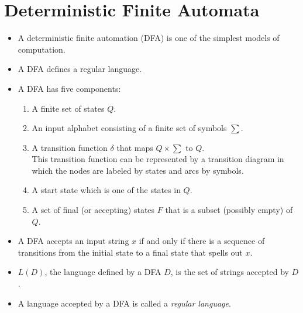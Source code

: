 \documentclass[]{article}
\begin{document}
\section{Deterministic Finite Automata}
  \begin{itemize}
    \item A deterministic finite automation (DFA) is one of the simplest models 
    of computation.
    \item A DFA defines a regular language.
    \item A DFA has five components:
      \begin{enumerate}
        \item A finite set of states $Q$.
        \item An input alphabet consisting of a finite set of symbols $\sum$.
        \item A transition function $\delta$ that maps $Q \times \sum$ to $Q$.\\
        This transition function can be represented by a transition diagram in 
        which the nodes are labeled by states and arcs by symbols.
        \item A start state which is one of the states in $Q$.
        \item A set of final (or accepting) states $F$ that is a subset 
        (possibly empty) of $Q$.
      \end{enumerate}
    \item A DFA accepts an input string $x$ if and only if there is a sequence 
    of transitions from the initial state to a final state that spells out $x$.
    \item $L(D)$, the language defined by a DFA $D$, is the set of strings 
    accepted by $D$.
    \item A language accepted by a DFA is called a \emph{regular language}.
  \end{itemize}
  
\end{document}
